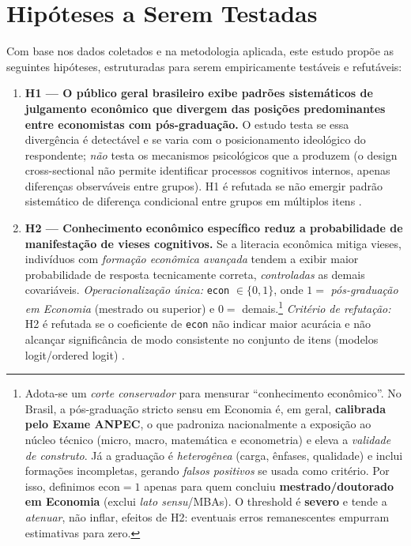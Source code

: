 \section{Hipóteses a Serem Testadas}
\label{sec:hipoteses}

Com base nos dados coletados e na metodologia aplicada, este estudo propõe as seguintes hipóteses, estruturadas para serem empiricamente testáveis e refutáveis:

\begin{enumerate}[label=\alph*)]

  \item \textbf{H1 — O público geral brasileiro exibe padrões sistemáticos de julgamento econômico que divergem das posições predominantes entre economistas com pós-graduação.}
  O estudo testa se essa divergência é detectável e se varia com o posicionamento ideológico do respondente; \textit{não} testa os mecanismos psicológicos que a produzem (o design cross-sectional não permite identificar processos cognitivos internos, apenas diferenças observáveis entre grupos). H1 é refutada se não emergir padrão sistemático de diferença condicional entre grupos em múltiplos itens \cite{The_Myth_of_the_Rational_Voter,blendon1997}.

  \item \textbf{H2 — Conhecimento econômico específico reduz a probabilidade de manifestação de vieses cognitivos.} 
  Se a literacia econômica mitiga vieses, indivíduos com \emph{formação econômica avançada} tendem a exibir maior probabilidade de resposta tecnicamente correta, \emph{controladas} as demais covariáveis. 
  \textit{Operacionalização única:} \texttt{econ} $\in\{0,1\}$, onde $1 =$ \emph{pós-graduação em Economia} (mestrado ou superior) e $0 =$ demais.\footnote{Adota-se um \emph{corte conservador} para mensurar “conhecimento econômico”. No Brasil, a pós-graduação stricto sensu em Economia é, em geral, \textbf{calibrada pelo Exame ANPEC}, o que padroniza nacionalmente a exposição ao núcleo técnico (micro, macro, matemática e econometria) e eleva a \emph{validade de construto}. Já a graduação é \emph{heterogênea} (carga, ênfases, qualidade) e inclui formações incompletas, gerando \emph{falsos positivos} se usada como critério. Por isso, definimos $\mathrm{econ}=1$ apenas para quem concluiu \textbf{mestrado/doutorado em Economia} (exclui \emph{lato sensu}/MBAs). O threshold é \textbf{severo} e tende a \emph{atenuar}, não inflar, efeitos de H2: eventuais erros remanescentes empurram estimativas para zero.}
  \textit{Critério de refutação:} H2 é refutada se o coeficiente de \texttt{econ} não indicar maior acurácia e não alcançar significância de modo consistente no conjunto de itens (modelos logit/ordered logit) \cite{downs1957economic,Judgment_under_Uncertainty}.


\end{enumerate}

